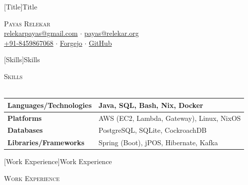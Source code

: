 \documentclass[a4paper]{article}
\newcommand{\lineunder} {
    \vspace*{-8pt} \\
    \hspace*{-18pt} \hrulefill \\
}
\newcommand{\header} [1] {
    {\hspace*{-18pt}\vspace*{6pt} \textsc{#1}}
    \vspace*{-6pt} \lineunder
}
\begin{document}
\vspace*{-40pt}

\vspace*{-10pt}
[Title]{Title}
\begin{center}
	{\Huge \scshape {Payas Relekar}}\\
	\href{mailto:relekarpayas@gmail.com}{relekarpayas@gmail.com} $\cdot$ \href{mailto:payas@relekar.org}{payas@relekar.org} \\
	\href{tel:+91-8459867068}{+91-8459867068} $\cdot$ \href{https://git.bhankas.org/payas/}{Forgejo} $\cdot$ \href{https://github.com/bhankas/}{GitHub}\\
\end{center}

[Skills]{Skills}
\header{Skills}
\vspace{1mm}
\bgroup
\setlength{\arrayrulewidth}{0.2mm}
\def\arraystretch{1.2}
\begin{tabularx}{\textwidth}{ | X | X | }
	\hline
	\textbf{Languages/Technologies} & Java, SQL, Bash, Nix, Docker               \\
	\hline
	\textbf{Platforms}              & AWS (EC2, Lambda, Gateway), Linux, NixOS  \\
	\hline
	\textbf{Databases}              & PostgreSQL, SQLite, CockroachDB           \\
	\hline
	\textbf{Libraries/Frameworks}   & Spring (Boot), jPOS, Hibernate, Kafka       \\
	\hline
\end{tabularx}
\egroup
\vspace{2mm}

[Work Experience]{Work Experience}
\header{Work Experience}
\vspace{1mm}
\end{document}
